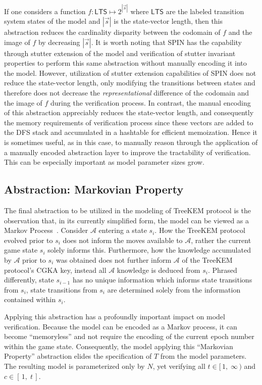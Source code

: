 \documentclass[runningheads]{llncs}
\newcommand{\Adversary}{\ensuremath{\mathcal{A}}\xspace}
\newcommand{\NumericRange}[2]{\ensuremath{\left[\,#1,\; #2\,\right]}\xspace}
\newcommand{\NumericRangeOpenR}[2]{\ensuremath{[\,#1,\; #2\,)}\xspace}
\begin{document}
If one considers a function $f: \mathsf{LTS} \mapsto 2^{\left|\vec{s}\right|}$ where $\mathsf{LTS}$ are the labeled transition system states of the model and $\left|\vec{s}\right|$ is the state-vector length, then this abstraction reduces the cardinality disparity between the codomain of $f$ and the image of $f$ by decreasing $\left|\vec{s}\right|$.  
It is worth noting that SPIN has the capability through stutter extension of the model and verification of stutter invariant properties to perform this same abstraction without manually encoding it into the model.
However, utilization of stutter extension capabilities of SPIN does not reduce the state-vector length, only modifying the transitions between states and therefore does not decrease the \emph{representational} difference of the codomain and the image of $f$ during the verification process.
In contrast, the manual encoding of this abstraction appreciably reduces the state-vector length, and consequently the memory requirements of verification process since these vectors are added to the DFS stack and accumulated in a hashtable for efficient memoization.
Hence it is sometimes useful, as in this case, to manually reason through the application of a manually encoded abstraction layer to improve the tractability of verification.
This can be especially important as model parameter sizes grow.


\subsection{Abstraction: Markovian Property}

The final abstraction to be utilized in the modeling of TreeKEM protocol is the observation that, in its currently simplified form, the model can be viewed as a Markov Process~\cite{markov1906a}.
Consider \Adversary entering a \CGKAsec state $s_{i}$.
How the TreeKEM protocol evolved prior to $s_{i}$ does not inform the moves available to \Adversary, rather the current game state $s_{i}$ solely informs this.
Furthermore, how the knowledge accumulated by \Adversary prior to $s_{i}$ was obtained does not further inform \Adversary of the TreeKEM protocol's CGKA key, instead all \Adversary knowledge is deduced from $s_{i}$.
Phrased differently, state $s_{i-1}$ has no unique information which informs state transitions from $s_{i}$, state transitions from $s_{i}$ are determined solely from the information contained within $s_{i}$.

Applying this abstraction has a profoundly important impact on model verification.
Because the model can be encoded as a Markov process, it can become ``memoryless'' and not require the encoding of the current epoch number within the game state.
Consequently, the model applying this ``Markovian Property'' abstraction elides the specification of $T$ from the model parameters.
The resulting model is parameterized only by $N$, yet verifying all $t \in \NumericRangeOpenR{1}{\infty}$ and $c \in \NumericRange{1}{t}$.
\end{document}
